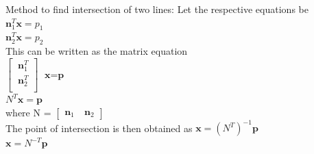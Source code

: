 \documentclass{beamer}
\begin{document}
\begin{frame}{Method to find intersection of two lines:}
Let the respective equations be\\
$\textbf{n}^T_1 \textbf{x} = p_1 $\\ $\textbf{n}^T_2 \textbf{x} = p_2 $\\

This can be written as the matrix equation \\
$ \begin{bmatrix}
  \ \textbf{n}^T_1 \\
  \ \textbf{n}^T_2 \\
\end{bmatrix} $
$ \textbf{x} = \textbf{p} $\\
$ N^T \textbf{x} = \textbf{p} $\\

where
 N = $\begin{bmatrix}
 \textbf{n}_1 &\
 \textbf{n}_2 
\end{bmatrix} $ \\

The point of intersection is then obtained as
$\textbf{x} = (N^T)^{-1} \textbf{p}$ \\
$\textbf{x}= N^{-T}\textbf{p}$


\end{frame}
\end{document}
